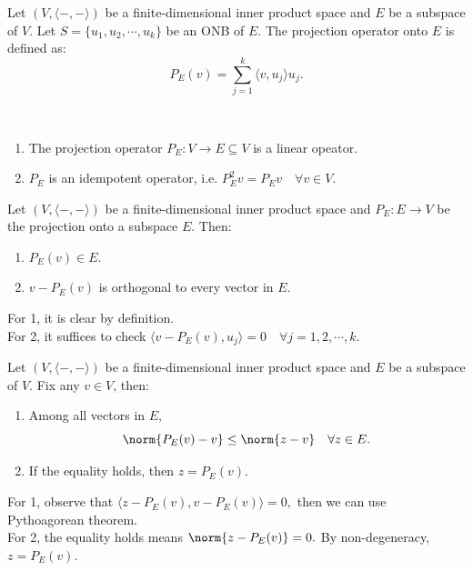 \begin{definition}
    Let $(V,\langle-,-\rangle)$ be a finite-dimensional inner product space and $E$ be a subspace of $V$.
    Let $S=\{u_1,u_2,\cdots,u_k\}$ be an ONB of $E$. The projection operator onto $E$ is defined as:
    \[P_E(v)=\sum_{j=1}^{k}\langle v, u_j\rangle u_j.\] 
\end{definition}

\begin{remark}\
    \begin{enumerate}
        \item The projection operator $P_E:V\to E\subseteq V$ is a linear opeator.
        \item $P_E$ is an idempotent operator, i.e. $P^2_E v = P_E v\quad\forall v\in V$.
    \end{enumerate}
\end{remark}

\begin{theorem}
    Let $(V,\langle-,-\rangle)$ be a finite-dimensional inner product space and $P_E:E\to V$ be the projection onto a subspace $E$.
    Then:
    \begin{enumerate}
        \item $P_E(v)\in E$.
        \item $v-P_E(v)$ is orthogonal to every vector in $E$.
    \end{enumerate}
\end{theorem}

\begin{pfbox}
    For 1, it is clear by definition.\\
    For 2, it suffices to check $\langle v-P_E(v), u_j\rangle=0\quad \forall j=1,2,\cdots,k.$
\end{pfbox}


\begin{theorem}
  Let $(V,\langle-,-\rangle)$ be a finite-dimensional inner product space and $E$ be a subspace of $V$.
  Fix any $v\in V$, then:
  \begin{enumerate}
    \item Among all vectors in $E$,
    $$\norm{P_E(v)-v}\le\norm{z-v}\quad \forall z\in E.$$
    \item If the equality holds, then $z=P_E(v).$
  \end{enumerate}
\end{theorem}

\begin{pfbox}
    For 1, observe that $\langle z-P_E(v), v-P_E(v)\rangle=0,$ then we can use Pythoagorean theorem.\\
    For 2, the equality holds means $\norm{z-P_E(v)}=0.$ By non-degeneracy, $z=P_E(v).$
\end{pfbox}


